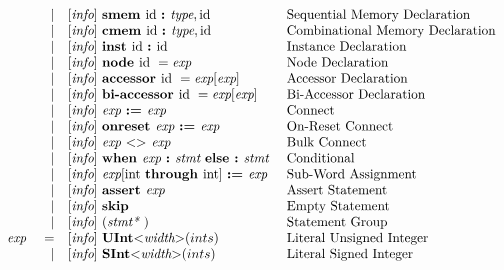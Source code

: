 \documentclass[10pt]{article}
\begin{document}
\[\begin{array}{rrll}
                &\vert &[\text{\em info}]\  \text{\bf smem\ } \text{id } \text{\bf :\ } \text{\em type} , \text{id}                                  &\text{Sequential Memory Declaration}\\
                &\vert &[\text{\em info}]\  \text{\bf cmem\ } \text{id } \text{\bf :\ } \text{\em type} , \text{id}                                  &\text{Combinational Memory Declaration}\\
                &\vert &[\text{\em info}]\  \text{\bf inst\ } \text{id } \text{\bf :\ } \text{id }                                                &\text{Instance Declaration}\\
                &\vert &[\text{\em info}]\  \text{\bf node\ } \text{id }  = \text{\em exp\ }                                               &\text{Node Declaration}\\
                &\vert &[\text{\em info}]\  \text{\bf accessor\ } \text{id } = \text{\em exp}[\text{\em exp}]                                &\text{Accessor Declaration}\\
                &\vert &[\text{\em info}]\  \text{\bf bi-accessor\ } \text{id } = \text{\em exp}[\text{\em exp}]                             &\text{Bi-Accessor Declaration}\\
                &\vert &[\text{\em info}]\  \text{\em exp\ } \text{\bf :=\ } \text{\em exp\ }                                               &\text{Connect}\\
                &\vert &[\text{\em info}]\  \text{\bf onreset\ } \text{\em exp\ } \text{\bf :=\ } \text{\em exp\ }                                  &\text{On-Reset Connect}\\
                &\vert &[\text{\em info}]\  \text{\em exp\ } \text{\bf $<>$\ } \text{\em exp\ }                                             &\text{Bulk Connect}\\
                &\vert &[\text{\em info}]\  \text{\bf when\ } \text{\em exp\ } \text{\bf :\ } \text{\em stmt\ } \text{\bf else :\ } \text{\em stmt\ }               &\text{Conditional}\\
                &\vert &[\text{\em info}]\  \text{\em exp}[\text{int }  \text{\bf through\ } \text{int}] \ \text{\bf :=\ } \text{\em exp}               &\text{Sub-Word Assignment}\\
                &\vert &[\text{\em info}]\  \text{\bf assert\ } \text{\em exp\ }                                                    &\text{Assert Statement}\\
                &\vert &[\text{\em info}]\  \text{\bf skip\ }                                                               &\text{Empty Statement}\\
                &\vert &[\text{\em info}]\  (\text{\em stmt*\ })                                                            &\text{Statement Group}\\
\text{\em exp\ }        &=     &[\text{\em info}]\  \text{\bf UInt} \text{\bf $<$} \text{\em width} \text{\bf $>$}(ints)                        &\text{Literal Unsigned Integer}\\
                &\vert &[\text{\em info}]\  \text{\bf SInt} \text{\bf $<$} \text{\em width} \text{\bf $>$}(ints)                        &\text{Literal Signed Integer}\\

\end{array}\]
\end{document}
